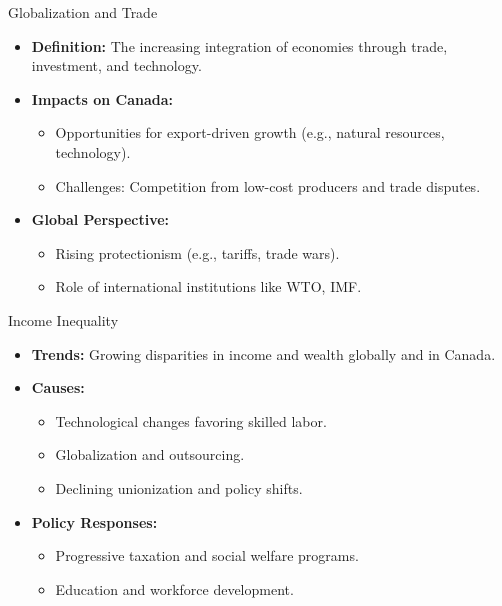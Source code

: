 \documentclass{beamer}
\begin{document}

\begin{frame}{Globalization and Trade}
  \begin{itemize}
    \item \textbf{Definition:} The increasing integration of economies through trade, investment, and technology.
    \item \textbf{Impacts on Canada:}
      \begin{itemize}
        \item Opportunities for export-driven growth (e.g., natural resources, technology).
        \item Challenges: Competition from low-cost producers and trade disputes.
      \end{itemize}
    \item \textbf{Global Perspective:}
      \begin{itemize}
        \item Rising protectionism (e.g., tariffs, trade wars).
        \item Role of international institutions like WTO, IMF.
      \end{itemize}
  \end{itemize}
\end{frame}


\begin{frame}{Income Inequality}
  \begin{itemize}
    \item \textbf{Trends:} Growing disparities in income and wealth globally and in Canada.
    \item \textbf{Causes:}
      \begin{itemize}
        \item Technological changes favoring skilled labor.
        \item Globalization and outsourcing.
        \item Declining unionization and policy shifts.
      \end{itemize}
    \item \textbf{Policy Responses:}
      \begin{itemize}
        \item Progressive taxation and social welfare programs.
        \item Education and workforce development.
      \end{itemize}
  \end{itemize}
\end{frame}
\end{document}
